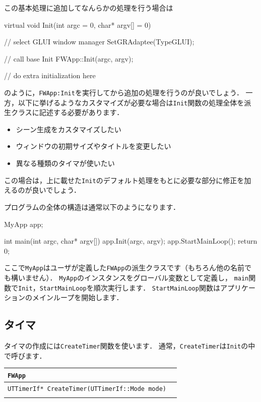 \KLUDGE この基本処理に追加してなんらかの処理を行う場合は
\begin{sourcecode}
virtual void Init(int argc = 0, char* argv[] = 0){
    // select GLUI window manager
    SetGRAdaptee(TypeGLUI);

    // call base Init
    FWApp::Init(argc, argv);

    // do extra initialization here


}
\end{sourcecode}
\KLUDGE のように，\texttt{FWApp:Init}\KLUDGE を実行してから追加の処理を行うのが良いでしょう．
\KLUDGE 一方，以下に挙げるようなカスタマイズが必要な場合は\texttt{Init}\KLUDGE 関数の処理全体を派生クラスに記述する必要があります．
\begin{itemize}
\item \KLUDGE シーン生成をカスタマイズしたい
\item \KLUDGE ウィンドウの初期サイズやタイトルを変更したい
\item \KLUDGE 異なる種類のタイマが使いたい
\end{itemize}
\KLUDGE この場合は，上に載せた\texttt{Init}\KLUDGE のデフォルト処理をもとに必要な部分に修正を加えるのが良いでしょう．

\KLUDGE プログラムの全体の構造は通常以下のようになります．

\begin{sourcecode}
MyApp app;

int main(int argc, char* argv[]){
    app.Init(argc, argv);
    app.StartMainLoop();
    return 0;
}
\end{sourcecode}

\KLUDGE ここで\texttt{MyApp}\KLUDGE はユーザが定義した\texttt{FWApp}\KLUDGE の派生クラスです（もちろん他の名前でも構いません）．
\texttt{MyApp}\KLUDGE のインスタンスをグローバル変数として定義し，
\texttt{main}\KLUDGE 関数で\texttt{Init}\KLUDGE ，\texttt{StartMainLoop}\KLUDGE を順次実行します．
\texttt{StartMainLoop}\KLUDGE 関数はアプリケーションのメインループを開始します．


\subsection*{\KLUDGE タイマ}

\KLUDGE タイマの作成には\texttt{CreateTimer}\KLUDGE 関数を使います．
\KLUDGE 通常，\texttt{CreateTimer}\KLUDGE は\texttt{Init}\KLUDGE の中で呼びます．

\noindent
\begin{tabular}{p{.7\hsize}p{.2\hsize}}
\\
\texttt{FWApp}												\\ \midrule
\texttt{UTTimerIf* CreateTimer(UTTimerIf::Mode mode)}	&	\\
\\
\end{tabular}

